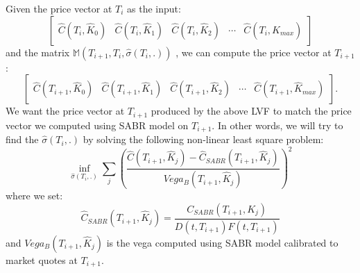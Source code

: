 \documentclass[letterpaper,12pt,titlepage,oneside,final]{book}
\numberwithin{equation}{section}
\theoremstyle{definition}
\begin{document}
Given the price vector at $T_{i}$ as the input:
\[\begin{bmatrix}
	\widehat{C}(T_{i},\widehat{K}_0)&
	\widehat{C}(T_{i},\widehat{K}_1)&
	\widehat{C}(T_{i},\widehat{K}_2)&
	\cdots&
	\widehat{C}(T_{i},\widehat{K}_{max})
\end{bmatrix}\] and the matrix $\mathcal{\mathbb{M}}(T_{i+1},T_{i}, \widehat{\sigma}(T_i,.))$ , we can compute  the price vector at $T_{i+1}$:
\[
\begin{bmatrix}
	\widehat{C}(T_{i+1},\widehat{K}_0)&
	\widehat{C}(T_{i+1},\widehat{K}_1)&
	\widehat{C}(T_{i+1},\widehat{K}_2)&
	\cdots&
	\widehat{C}(T_{i+1},\widehat{K}_{max})
	\end{bmatrix}.
\]
We want  the price vector at $T_{i+1}$ produced by the above LVF to match the price vector we computed using SABR model on $T_{i+1}$. In other words, we will try to find the $\widehat{\sigma}(T_i,.)$ by solving the following non-linear least square problem:
\begin{equation}
\inf_{\widehat{\sigma}(T_i,.)} \sum_{j}(\frac{\widehat{C}(T_{i+1},\widehat{K}_j)-\widehat{C}_{SABR}(T_{i+1},\widehat{K}_j)}{Vega_{B}(T_{i+1},\widehat{K}_j)})^2
\label{eq:LVFCal}
 \end{equation}
where we set: 
 \[
	\widehat{C}_{SABR}(T_{i+1},\widehat{K}_j)=\frac{C_{SABR}(T_{i+1},K_j)}{D(t,T_{i+1})F(t,T_{i+1})}
\]and $Vega_{B}(T_{i+1},\widehat{K}_j)$ is the vega computed using SABR model calibrated to market quotes at $T_{i+1}$.
\end{document}

